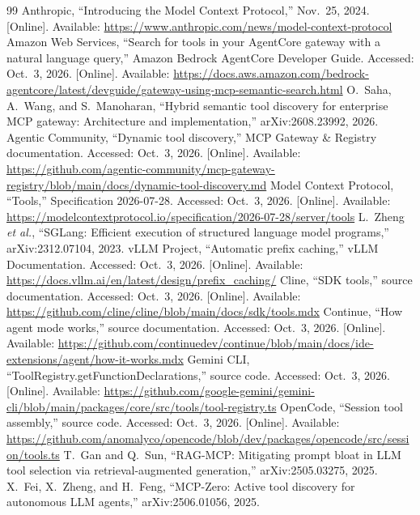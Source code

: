 \documentclass[11pt]{article}
\begin{document}
\begin{thebibliography}{99}\small
{} Anthropic, ``Introducing the Model Context Protocol,'' Nov.\ 25, 2024. [Online]. Available: \url{https://www.anthropic.com/news/model-context-protocol}
 Amazon Web Services, ``Search for tools in your AgentCore gateway with a natural language query,'' Amazon Bedrock AgentCore Developer Guide. Accessed: Oct.\ 3, 2026. [Online]. Available: \url{https://docs.aws.amazon.com/bedrock-agentcore/latest/devguide/gateway-using-mcp-semantic-search.html}
 O.~Saha, A.~Wang, and S.~Manoharan, ``Hybrid semantic tool discovery for enterprise MCP gateway: Architecture and implementation,'' arXiv:2608.23992, 2026.
 Agentic Community, ``Dynamic tool discovery,'' MCP Gateway \& Registry documentation. Accessed: Oct.\ 3, 2026. [Online]. Available: \url{https://github.com/agentic-community/mcp-gateway-registry/blob/main/docs/dynamic-tool-discovery.md}
 Model Context Protocol, ``Tools,'' Specification 2026-07-28. Accessed: Oct.\ 3, 2026. [Online]. Available: \url{https://modelcontextprotocol.io/specification/2026-07-28/server/tools}
 L.~Zheng \emph{et al.}, ``SGLang: Efficient execution of structured language model programs,'' arXiv:2312.07104, 2023.
 vLLM Project, ``Automatic prefix caching,'' vLLM Documentation. Accessed: Oct.\ 3, 2026. [Online]. Available: \url{https://docs.vllm.ai/en/latest/design/prefix_caching/}
 Cline, ``SDK tools,'' source documentation. Accessed: Oct.\ 3, 2026. [Online]. Available: \url{https://github.com/cline/cline/blob/main/docs/sdk/tools.mdx}
 Continue, ``How agent mode works,'' source documentation. Accessed: Oct.\ 3, 2026. [Online]. Available: \url{https://github.com/continuedev/continue/blob/main/docs/ide-extensions/agent/how-it-works.mdx}
 Gemini CLI, ``ToolRegistry.getFunctionDeclarations,'' source code. Accessed: Oct.\ 3, 2026. [Online]. Available: \url{https://github.com/google-gemini/gemini-cli/blob/main/packages/core/src/tools/tool-registry.ts}
 OpenCode, ``Session tool assembly,'' source code. Accessed: Oct.\ 3, 2026. [Online]. Available: \url{https://github.com/anomalyco/opencode/blob/dev/packages/opencode/src/session/tools.ts}
 T.~Gan and Q.~Sun, ``RAG-MCP: Mitigating prompt bloat in LLM tool selection via retrieval-augmented generation,'' arXiv:2505.03275, 2025.
 X.~Fei, X.~Zheng, and H.~Feng, ``MCP-Zero: Active tool discovery for autonomous LLM agents,'' arXiv:2506.01056, 2025.

\end{thebibliography}
\end{document}
